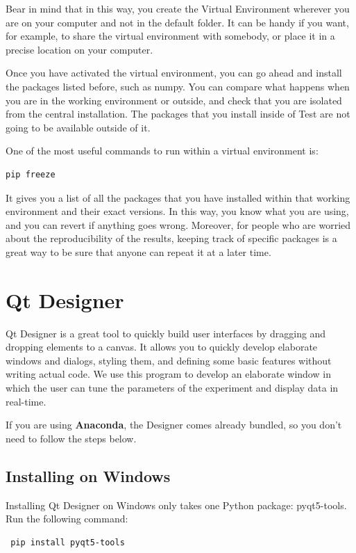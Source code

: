 Bear in mind that in this way, you create the Virtual Environment wherever you are on your computer and not in the default folder. It can be handy if you want, for example, to share the virtual environment with somebody, or place it in a precise location on your computer.

Once you have activated the virtual environment, you can go ahead and install the packages listed before, such as numpy. You can compare what happens when you are in the working environment or outside, and check that you are isolated from the central installation. The packages that you install inside of Test are not going to be available outside of it.

One of the most useful commands to run within a virtual environment is:

\begin{verbatim}
pip freeze
\end{verbatim}

It gives you a list of all the packages that you have installed within that working environment and their exact versions. In this way, you know what you are using, and you can revert if anything goes wrong. Moreover, for people who are worried about the reproducibility of the results, keeping track of specific packages is a great way to be sure that anyone can repeat it at a later time.

\section{Qt Designer}\label{sec:install-qt-designer}
Qt Designer is a great tool to quickly build user interfaces by dragging and dropping elements to a canvas. It allows you to quickly develop elaborate windows and dialogs, styling them, and defining some basic features without writing actual code. We use this program to develop an elaborate window in which the user can tune the parameters of the experiment and display data in real-time.

If you are using \textbf{Anaconda}, the Designer comes already bundled, so you don't need to follow the steps below.

\subsection{Installing on Windows}\label{subsec:installing-on-windows}
Installing Qt Designer on Windows only takes one Python package: pyqt5-tools. Run the following command:

\begin{verbatim}
 pip install pyqt5-tools
\end{verbatim}

